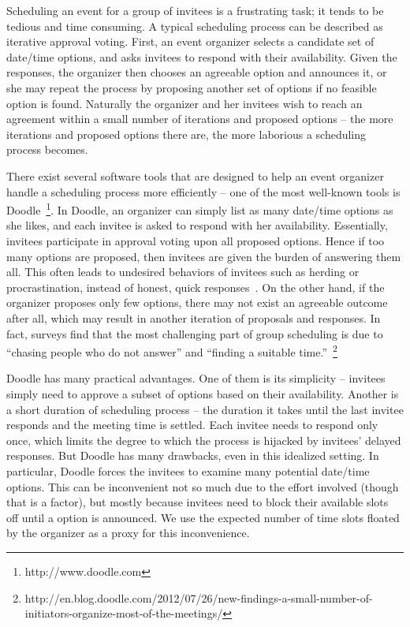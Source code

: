 \label{bdoodle:chapter}

Scheduling an event for a group of invitees is a frustrating task; it tends to be tedious and time consuming.
A typical scheduling process can be described as iterative approval voting.
First, an event organizer selects a candidate set of date/time options, and asks invitees to respond with their availability. 
Given the responses, the organizer then chooses an agreeable option and announces it, or she may repeat the process by proposing another set of options if no feasible option is found. 
Naturally the organizer and her invitees wish to reach an agreement within a small number of iterations and proposed options -- the more iterations and proposed options there are, the more laborious a scheduling process becomes. 

There exist several software tools that are designed to help an event organizer handle a scheduling process more efficiently -- one of the most well-known tools is Doodle~\footnote{http://www.doodle.com}. 
In Doodle, an organizer can simply list as many date/time options as she likes, 
and each invitee is asked to respond with her availability. 
Essentially, invitees participate in approval voting upon all proposed options.
Hence if too many options are proposed, then invitees are given the burden of answering them all. 
This often leads to undesired behaviors of invitees such as herding or procrastination, instead of honest, quick responses~\cite{zou2015strategic}. 
On the other hand, if the organizer proposes only few options, there may not exist an agreeable outcome after all, which may result in another iteration of proposals and responses. 
In fact, surveys find that the most challenging part of group scheduling is due to ``chasing people who do not answer'' and ``finding a suitable time.''~\footnote{http://en.blog.doodle.com/2012/07/26/new-findings-a-small-number-of-initiators-organize-most-of-the-meetings/}

Doodle has many practical advantages. 
One of them is its simplicity -- invitees simply need to approve a subset of options based on their availability.
Another is a short duration of scheduling process -- the duration it takes until
the last invitee responds and the meeting time is settled. Each invitee
needs to respond only once, which limits the degree to which the
process is hijacked by invitees' delayed responses. But Doodle has many
drawbacks, even in this idealized setting. In particular, Doodle
forces the invitees to examine many potential date/time options. This can be
inconvenient not so much due to the effort involved (though that is a
factor), but mostly because invitees need to block their available slots
off until a option is announced. We use the expected number of time
slots floated by the organizer as a proxy for this inconvenience.

